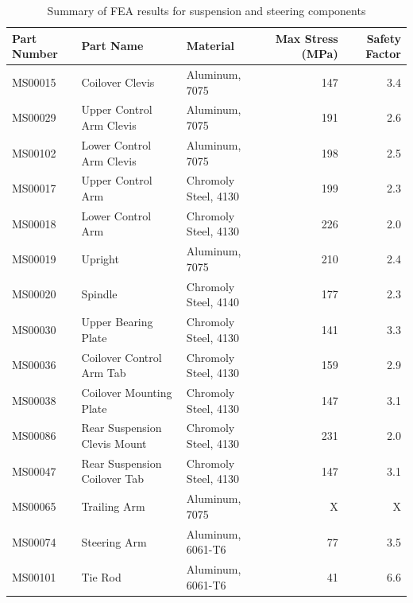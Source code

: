 \documentclass[10pt]{article}
\begin{document}
\begin{table}
\centering
\begin{tabular}{lllrr}
\toprule
Part Number & Part Name                    & Material             & Max Stress (\si{\mega\pascal}) & Safety Factor \\
\midrule
MS00015     & Coilover Clevis              & Aluminum, 7075       &                 147 &           3.4 \\
MS00029     & Upper Control Arm Clevis     & Aluminum, 7075       &                 191 &           2.6 \\
MS00102     & Lower Control Arm Clevis     & Aluminum, 7075       &                 198 &           2.5 \\
MS00017     & Upper Control Arm            & Chromoly Steel, 4130 &                 199 &           2.3 \\
MS00018     & Lower Control Arm            & Chromoly Steel, 4130 &                 226 &           2.0 \\
MS00019     & Upright                      & Aluminum, 7075       &                 210 &           2.4 \\
MS00020     & Spindle                      & Chromoly Steel, 4140 &                 177 &           2.3 \\
MS00030     & Upper Bearing Plate          & Chromoly Steel, 4130 &                 141 &           3.3 \\
MS00036     & Coilover Control Arm Tab     & Chromoly Steel, 4130 &                 159 &           2.9 \\
MS00038     & Coilover Mounting Plate      & Chromoly Steel, 4130 &                 147 &           3.1 \\
MS00086     & Rear Suspension Clevis Mount & Chromoly Steel, 4130 &                 231 &           2.0 \\
MS00047     & Rear Suspension Coilover Tab & Chromoly Steel, 4130 &                 147 &           3.1 \\
MS00065     & Trailing Arm                 & Aluminum, 7075       &                   X &             X \\
MS00074     & Steering Arm                 & Aluminum, 6061-T6    &                  77 &           3.5 \\
MS00101     & Tie Rod                      & Aluminum, 6061-T6    &                  41 &           6.6 \\
\bottomrule
\end{tabular}
\caption{Summary of FEA results for suspension and steering components}
\label{tab:fea-results-suspension-steering}
\end{table}
\end{document}
